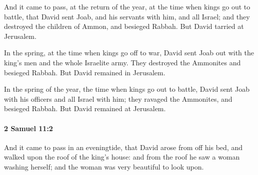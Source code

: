 			\begin{versebox}
					\item[BHS] 
					\item[ASV] And it came to pass, at the return of the year, at the time when kings go out to battle, that David sent Joab, and his servants with him, and all Israel; and they destroyed the children of Ammon, and besieged Rabbah. But David tarried at Jerusalem.
					\item[NIV] In the spring, at the time when kings go off to war, David sent Joab out with the king’s men and the whole Israelite army. They destroyed the Ammonites and besieged Rabbah. But David remained in Jerusalem.
					\item[NRSV] In the spring of the year, the time when kings go out to battle, David sent Joab with his officers and all Israel with him; they ravaged the Ammonites, and besieged Rabbah. But David remained at Jerusalem.
			\end{versebox}

		\paragraph{2 Samuel 11:2} %
			\label{2SAMUEL-11-2}

			And it came to pass in an eveningtide, that David arose from off his bed, and walked upon the roof of the king’s house: and from the roof he saw a woman washing herself; and the woman was very beautiful to look upon.

